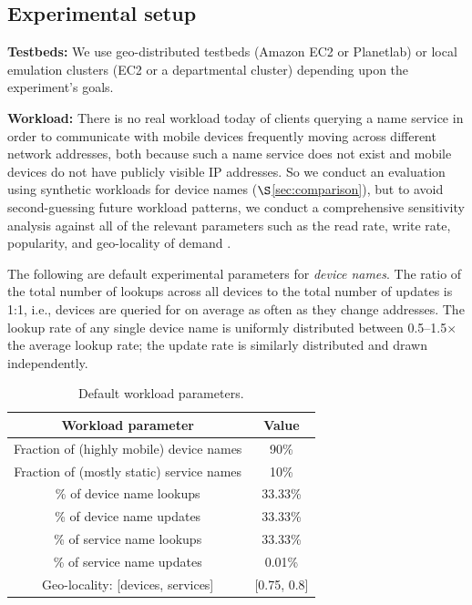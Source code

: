 \subsection{Experimental setup}

\textbf{Testbeds:} We use geo-distributed testbeds (Amazon EC2 or Planetlab) or local emulation clusters (EC2 or a departmental cluster) depending upon the experiment's goals.

\textbf{Workload:} There is no real workload today of clients querying a name service in order to communicate with mobile devices frequently moving across different network addresses, both because such a name service does not exist and mobile devices do not have publicly visible IP addresses. So we conduct an evaluation using synthetic workloads for device names ($\S$\ref{sec:comparison}), but to avoid second-guessing future workload patterns, we conduct a comprehensive sensitivity analysis against all of the relevant parameters such as the read rate, write rate, popularity, and geo-locality of demand \cite{techreport}.


The following are default experimental parameters for {\em device names}. The ratio of the total number of lookups across all devices to the total number of updates is 1:1, i.e., devices are queried for on average as often as they change addresses. The lookup rate of any single device name is uniformly distributed between 0.5--1.5$\times$ the average lookup rate; the update rate is similarly distributed and drawn independently.%


\begin{table}[t]
\centering
\small{
\begin{tabular}{c|c}
{\bf Workload parameter} & {\bf Value} \\ \hline
Fraction of (highly mobile) device names & 90\%  \\ \hline
Fraction of (mostly static) service names & 10\%   \\ \hline
\% of device name lookups   & 33.33\%  \\ \hline
\% of device name updates  & 33.33\% \\ \hline
\% of service name lookups   & 33.33\%  \\ \hline
\% of service name updates  & 0.01\% \\ \hline
Geo-locality: [devices, services] & [0.75, 0.8]  \\ \hline
\end{tabular}
}
\caption{Default workload parameters. %
}
\vspace{-0.15in}
\label{tab:setup}
\end{table}




